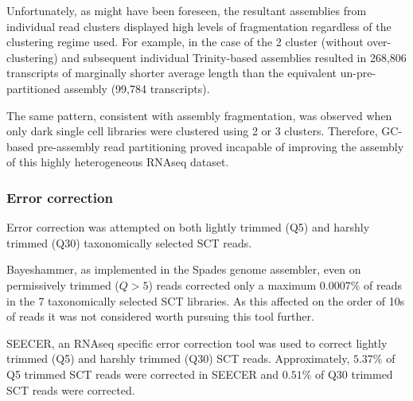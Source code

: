 Unfortunately, as might have been foreseen, the resultant assemblies from individual
read clusters displayed high levels of fragmentation regardless of the clustering
regime used.  For example, in the case of the 2 cluster (without over-clustering) 
and subsequent individual Trinity-based assemblies resulted in 268,806 transcripts
of marginally shorter average length than the equivalent un-pre-partitioned assembly
(99,784 transcripts).

The same pattern, consistent with assembly fragmentation, 
was observed when only dark single cell libraries were clustered using 
2 or 3 clusters. 
Therefore, GC-based pre-assembly read partitioning proved incapable of improving
the assembly of this highly heterogeneous RNAseq dataset.


\subsubsection{Error correction}

Error correction was attempted on both lightly trimmed (Q5) and harshly trimmed (Q30) 
taxonomically selected SCT reads.

Bayeshammer, as implemented in the Spades genome assembler, even on permissively trimmed
(\(Q>5\)) reads corrected only a maximum \(0.0007\%\) of reads in the 7 taxonomically selected SCT libraries.
As this affected on the order of 10s of reads it was not considered worth pursuing this tool further.

SEECER, an RNAseq specific error correction tool was used to correct 
lightly trimmed (Q5) and harshly trimmed (Q30) SCT reads.  
Approximately, \(5.37\%\) of Q5 trimmed SCT reads
were corrected in SEECER and \(0.51\%\) of Q30 trimmed
SCT reads were corrected.  

